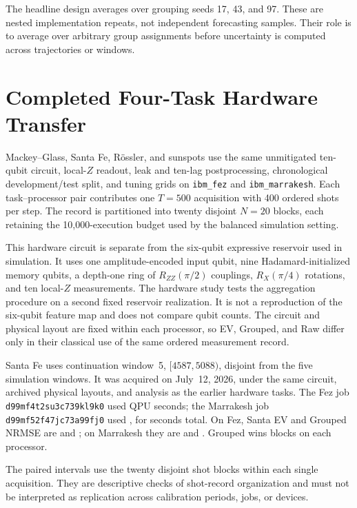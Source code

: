 \documentclass[10pt,conference]{IEEEtran}
\begin{document}
The headline design averages over grouping seeds 17, 43, and 97. These are
nested implementation repeats, not independent forecasting samples. Their
role is to average over arbitrary group assignments before uncertainty is
computed across trajectories or windows.

\section{Completed Four-Task Hardware Transfer}
\label{app:hardware}

Mackey--Glass, Santa Fe, R\"ossler, and sunspots use the same unmitigated
ten-qubit circuit, local-$Z$ readout, leak and ten-lag postprocessing,
chronological development/test split, and tuning grids on \texttt{ibm\_fez} and
\texttt{ibm\_marrakesh}. Each task--processor pair contributes one $T=500$
acquisition with 400 ordered shots per step. The record is partitioned into
twenty disjoint $N=20$ blocks, each retaining the 10,000-execution budget used
by the balanced simulation setting.

This hardware circuit is separate from the six-qubit expressive reservoir used
in simulation. It uses one amplitude-encoded input qubit, nine
Hadamard-initialized memory qubits, a depth-one ring of
$R_{ZZ}(\pi/2)$ couplings, $R_X(\pi/4)$ rotations, and ten local-$Z$
measurements. The hardware study tests the aggregation procedure on a second
fixed reservoir realization. It is not a reproduction of the six-qubit feature
map and does not compare qubit counts. The circuit and physical layout are
fixed within each processor, so EV, Grouped, and Raw differ only in their
classical use of the same ordered measurement record.

Santa Fe uses continuation window~5, $[4587,5088)$, disjoint from the five
simulation windows. It was acquired on July~12, 2026, under the same circuit,
archived physical layouts, and analysis as the earlier hardware tasks. The Fez
job \texttt{d99mf4t2su3c739kl9k0} used \QAIHardwareFezSeconds{} QPU seconds;
the Marrakesh job \texttt{d99mf52f47jc73a99fj0} used
\QAIHardwareMarrakeshSeconds{}, for \QAIHardwareTotalSeconds{} seconds total.
On Fez, Santa EV and Grouped NRMSE are \QAIHardwareFezSantaEV{} and
\QAIHardwareFezSantaGrouped{}; on Marrakesh they are
\QAIHardwareMarrakeshSantaEV{} and \QAIHardwareMarrakeshSantaGrouped{}.
Grouped wins \QAIHardwareSantaWins{} blocks on each processor.

The paired intervals use the twenty disjoint shot blocks within each single
acquisition. They are descriptive checks of shot-record organization and must
not be interpreted as replication across calibration periods, jobs, or devices.
\end{document}
